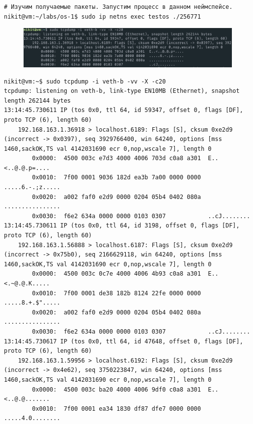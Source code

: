 \documentclass[11pt, a4paper]{article}
\begin{document}
\begin{Verbatim}[fontsize=\small]
  # Изучим получаемые пакеты. Запустим процесс в данном неймспейсе.
nikit@vm:~/labs/os-1$ sudo ip netns exec testos ./256771
\end{Verbatim}


\begin{figure}[h]
  \centering
  \includegraphics[width=\textwidth]{tcpdump.png}
\end{figure}

\begin{Verbatim}[fontsize=\footnotesize,breaklines=true]
nikit@vm:~$ sudo tcpdump -i veth-b -vv -X -c20
tcpdump: listening on veth-b, link-type EN10MB (Ethernet), snapshot length 262144 bytes
13:14:45.730611 IP (tos 0x0, ttl 64, id 59347, offset 0, flags [DF], proto TCP (6), length 60)
    192.168.163.1.36918 > localhost.6189: Flags [S], cksum 0xe2d9 (incorrect -> 0x0397), seq 3929766400, win 64240, options [mss 1460,sackOK,TS val 4142031690 ecr 0,nop,wscale 7], length 0
        0x0000:  4500 003c e7d3 4000 4006 703d c0a8 a301  E..<..@.@.p=....
        0x0010:  7f00 0001 9036 182d ea3b 7a00 0000 0000  .....6.-.;z.....
        0x0020:  a002 faf0 e2d9 0000 0204 05b4 0402 080a  ................
        0x0030:  f6e2 634a 0000 0000 0103 0307            ..cJ........
13:14:45.730611 IP (tos 0x0, ttl 64, id 3198, offset 0, flags [DF], proto TCP (6), length 60)
    192.168.163.1.56888 > localhost.6187: Flags [S], cksum 0xe2d9 (incorrect -> 0x75b0), seq 2166629118, win 64240, options [mss 1460,sackOK,TS val 4142031690 ecr 0,nop,wscale 7], length 0
        0x0000:  4500 003c 0c7e 4000 4006 4b93 c0a8 a301  E..<.~@.@.K.....
        0x0010:  7f00 0001 de38 182b 8124 22fe 0000 0000  .....8.+.$".....
        0x0020:  a002 faf0 e2d9 0000 0204 05b4 0402 080a  ................
        0x0030:  f6e2 634a 0000 0000 0103 0307            ..cJ........
13:14:45.730617 IP (tos 0x0, ttl 64, id 47648, offset 0, flags [DF], proto TCP (6), length 60)
    192.168.163.1.59956 > localhost.6192: Flags [S], cksum 0xe2d9 (incorrect -> 0x4e62), seq 3750223847, win 64240, options [mss 1460,sackOK,TS val 4142031690 ecr 0,nop,wscale 7], length 0
        0x0000:  4500 003c ba20 4000 4006 9df0 c0a8 a301  E..<..@.@.......
        0x0010:  7f00 0001 ea34 1830 df87 dfe7 0000 0000  .....4.0........

\end{Verbatim}
\end{document}
